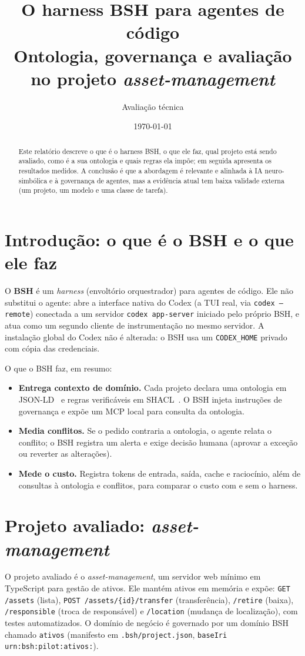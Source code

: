 \documentclass[11pt,a4paper]{article}
\title{O harness BSH para agentes de código\\\large Ontologia, governança e avaliação no projeto \emph{asset-management}}
\author{Avaliação técnica}
\date{\today}
\begin{document}
\maketitle

\begin{abstract}
Este relatório descreve o que é o harness BSH, o que ele faz, qual projeto está sendo avaliado, como é a sua ontologia e quais regras ela impõe; em seguida apresenta os resultados medidos. A conclusão é que a abordagem é relevante e alinhada à IA neuro-simbólica e à governança de agentes, mas a evidência atual tem baixa validade externa (um projeto, um modelo e uma classe de tarefa).
\end{abstract}

\section{Introdução: o que é o BSH e o que ele faz}
O \textbf{BSH} é um \emph{harness} (envoltório orquestrador) para agentes de código. Ele não substitui o agente: abre a interface nativa do Codex (a TUI real, via \texttt{codex --remote}) conectada a um servidor \texttt{codex app-server} iniciado pelo próprio BSH, e atua como um segundo cliente de instrumentação no mesmo servidor. A instalação global do Codex não é alterada: o BSH usa um \texttt{CODEX\_HOME} privado com cópia das credenciais.

O que o BSH faz, em resumo:
\begin{itemize}[leftmargin=1.4em]
\item \textbf{Entrega contexto de domínio.} Cada projeto declara uma ontologia em JSON-LD~\cite{w3c-jsonld} e regras verificáveis em SHACL~\cite{w3c-shacl}. O BSH injeta instruções de governança e expõe um MCP local para consulta da ontologia.
\item \textbf{Media conflitos.} Se o pedido contraria a ontologia, o agente relata o conflito; o BSH registra um alerta e exige decisão humana (aprovar a exceção ou reverter as alterações).
\item \textbf{Mede o custo.} Registra tokens de entrada, saída, cache e raciocínio, além de consultas à ontologia e conflitos, para comparar o custo com e sem o harness.
\end{itemize}

\section{Projeto avaliado: \emph{asset-management}}
O projeto avaliado é o \emph{asset-management}, um servidor web mínimo em TypeScript para gestão de ativos. Ele mantém ativos em memória e expõe: \texttt{GET /assets} (lista), \texttt{POST /assets/\{id\}/transfer} (transferência), \texttt{/retire} (baixa), \texttt{/responsible} (troca de responsável) e \texttt{/location} (mudança de localização), com testes automatizados. O domínio de negócio é governado por um domínio BSH chamado \texttt{ativos} (manifesto em \texttt{.bsh/project.json}, \texttt{baseIri} \texttt{urn:bsh:pilot:ativos:}).
\end{document}
